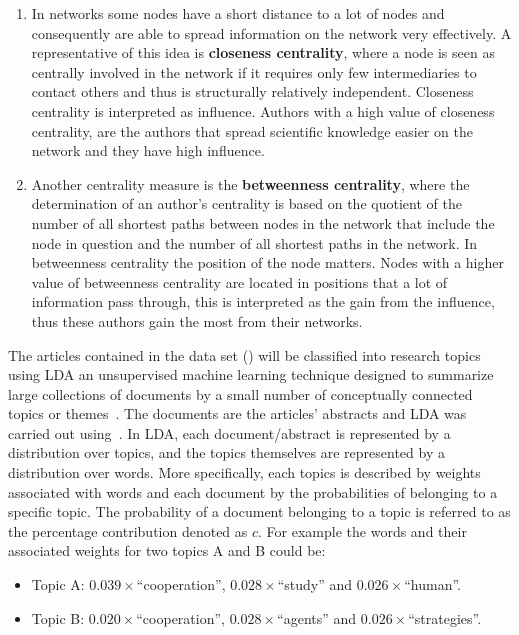 \documentclass{article}
\theoremstyle{definition}
\begin{document}
\begin{enumerate}
    \item In networks some nodes have a short distance to a lot of nodes and
    consequently are able to spread information on the network very effectively.
    A representative of this idea is \textbf{closeness centrality}, where a node
    is seen as centrally involved in the network if it requires only few
    intermediaries to contact others and thus is structurally relatively
    independent. Closeness centrality is interpreted as influence. Authors with a high
    value of closeness centrality, are the authors that spread scientific
    knowledge easier on the network and they have high influence.
    \item Another centrality measure is the \textbf{betweenness centrality},
    where the determination of an author's centrality is based on the quotient
    of the number of all shortest paths between nodes in the network that
    include the node in question and the number of all shortest paths in the
    network. In betweenness centrality the position of the node matters. Nodes
    with a higher value of betweenness centrality are located in positions that
    a lot of information pass through, this is interpreted as the gain from
    the influence, thus these authors gain the most from their networks.
\end{enumerate}

The articles contained in the data set (\cite{pd_data_2018}) will be classified
into research topics using LDA an unsupervised machine learning technique
designed to summarize large collections of documents by a small number of
conceptually connected topics or themes~\cite{Blei2003, Grimmer2013}. The
documents are the articles' abstracts and LDA was carried out using~\cite{rehurek_lrec}.
In LDA, each document/abstract is represented by a distribution over topics,
and the topics themselves are represented by a distribution over words. More
specifically, each topics is described by weights associated with words and
each document by the probabilities of belonging to a specific topic. The
probability of a document belonging to a topic is referred to as the percentage
contribution denoted as \(c\). For example the words and their associated
weights for two topics A and B could be:

\begin{itemize}
    \item Topic A: \(0.039 \times\)``cooperation'', \(0.028 \times\)``study'' and \(0.026 \times\)``human''.
    \item Topic B: \(0.020 \times\)``cooperation'', \(0.028 \times\)``agents'' and
    \(0.026 \times\)``strategies''.
\end{itemize}
\end{document}
